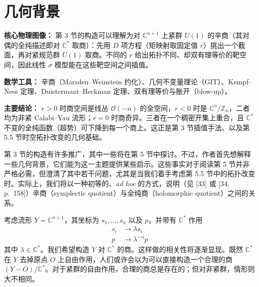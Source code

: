 
\section{几何背景}

\begin{keytakeaway}
\textbf{核心物理图像：}
第 3 节的构造可以理解为对 $\mathbb{C}^{n+1}$ 上紧群 $U(1)$ 的辛商（其对偶的全纯描述即对 $\mathbb{C}^*$ 取商）：先用 $D$ 项方程（矩映射取固定值 $r$）挑出一个截面，再对紧规范群 $U(1)$ 取商。不同的 $r$ 给出拓扑不同、却双有理等价的靶空间，因此线性 $\sigma$ 模型能在这些靶空间之间插值。
\par\textbf{数学工具：}
辛商（Marsden--Weinstein 约化）、几何不变量理论（GIT）、Kempf--Ness 定理、Duistermaat--Heckman 定理、双有理等价与胀开（blow-up）。
\par\textbf{主要结论：}
$r>0$ 时商空间是线丛 $\mathcal{O}(-n)$ 的全空间，$r<0$ 时是 $\mathbb{C}^n/\mathbb{Z}_n$，二者均为非紧 Calabi--Yau 流形；$r=0$ 时商奇异。三者在一个稠密开集上重合，且 $\mathbb{C}^*$ 不变的全纯函数（超势）可下降到每一个商上。这正是第 3 节插值手法、以及第 5.5 节时空拓扑改变的几何基础。
\end{keytakeaway}

第 3 节的构造有许多推广，其中一些将在第 5 节中探讨。不过，作者首先想解释一些几何背景，它们能为这一主题提供某些启示。这些事实对于阅读第 5 节并非严格必需，但澄清了其中若干问题，尤其是当我们着手考虑第 5.5 节中的拓扑改变时。实际上，我们将以一种初等的、\emph{ad hoc} 的方式，说明（见 [33] 或 [34, p.~158]）辛商（symplectic quotient）与全纯商（holomorphic quotient）之间的关系。

考虑流形 $Y=\mathbb{C}^{n+1}$，其坐标为 $s_1,\ldots,s_n$ 以及 $p$，并带有 $\mathbb{C}^*$ 作用
\begin{equation}
\begin{aligned} s_i &\to \lambda s_i\\ p &\to \lambda^{-n}p \end{aligned}
\tag{4.1}
\end{equation}
其中 $\lambda\in\mathbb{C}^*$。我们希望构造 $Y$ 对 $\mathbb{C}^*$ 的商。这样做的相关性将逐渐显现。既然 $\mathbb{C}^*$ 在 $Y$ 去掉原点 $O$ 上自由作用，人们或许会以为可以直接构造一个合理的商 $(Y-O)/\mathbb{C}^*$。对于紧群的自由作用，合理的商总是存在的；但对非紧群，情形则大不相同。

